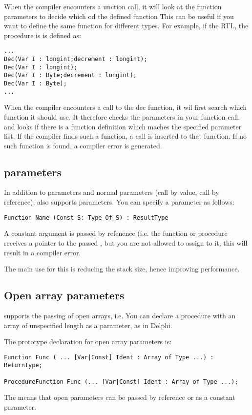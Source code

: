 \documentclass{report}
\begin{document}
When the compiler encounters a unction call, it will look at the function
parameters to decide which od the defined function
This can be useful if you want to define the same function for different
types. For example, if the RTL, the   procedure is
is defined as:
\begin{verbatim}
...
Dec(Var I : longint;decrement : longint);
Dec(Var I : longint);
Dec(Var I : Byte;decrement : longint);
Dec(Var I : Byte);
...
\end{verbatim}
When the compiler encounters a call to the dec function, it wil first search
which function it should use. It therefore checks the parameters in your
function call, and looks if there is a function definition which maches the
specified parameter list. If the compiler finds such a function, a call is
inserted to that function. If no such function is found, a compiler error is
generated.

\subsection{ parameters}
In addition to  parameters and normal parameters (call by value,
call by reference), \fpk also supports  parameters. You can
specify a  parameter as follows:
\begin{verbatim}
Function Name (Const S: Type_Of_S) : ResultType
\end{verbatim}
A constant argument is passed by refenence 
(i.e. the function or procedure receives a pointer to the passed , 
but you are not allowed to assign to it, this will result in a compiler error.

The main use for this is reducing the stack size, hence improving
performance.

\subsection{Open array parameters}
\fpk supports the passing of open arrays, i.e. You can declare a procedure
with an array of unspecified length as a parameter, as in Delphi.

The prototype declaration for open array parameters is:
\begin{verbatim}
Function Func ( ... [Var|Const] Ident : Array of Type ...) : ReturnType;

ProcedureFunction Func (... [Var|Const] Ident : Array of Type ...);
\end{verbatim}
The  means that open parameters can be passed by reference
or as a constant parameter.
\end{document}
